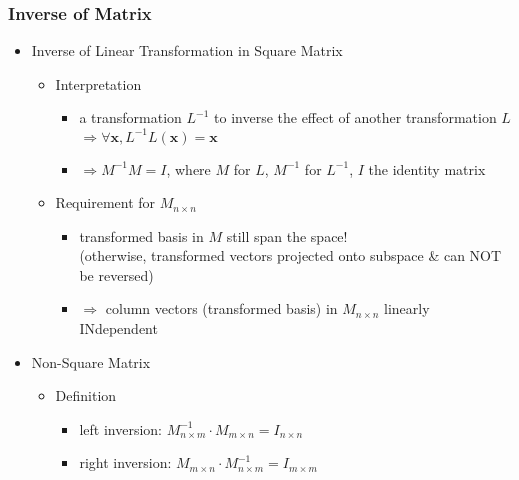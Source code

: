\subsubsection{Inverse of Matrix}
\begin{itemize}
\item Inverse of Linear Transformation in Square Matrix
	\begin{itemize}
	\item Interpretation
		\begin{itemize}
		\item a transformation $L^{-1}$ to inverse the effect of another transformation $L$ \\
		$\Rightarrow \forall \mathbf x, L^{-1}L(\mathbf x) = \mathbf x$
		\item $\Rightarrow M^{-1}M = I$, where $M$ for $L$, $M^{-1}$ for $L^{-1}$, $I$ the identity matrix
		\end{itemize}
	\item Requirement for $M_{n\times n}$
		\begin{itemize}
		\item transformed basis in $M$ still span the space! \\
		(otherwise, transformed vectors projected onto subspace \& can NOT be reversed)
		\item $\Rightarrow$ column vectors (transformed basis) in $M_{n\times n}$ linearly INdependent
		\end{itemize}
	\end{itemize}
\item Non-Square Matrix
	\begin{itemize}
	\item Definition
		\begin{itemize}
		\item left inversion: $M^{-1}_{n\times m}\cdot M_{m\times n} = I_{n\times n}$
		\item right inversion: $M_{m\times n}\cdot M^{-1}_{n\times m} = I_{m\times m}$
		\end{itemize}	
	\end{itemize}
\end{itemize}

